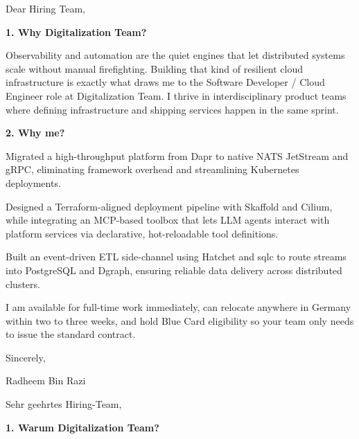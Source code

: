 \documentclass[11pt,a4paper]{coverletter}
\begin{document}

\opening{Dear Hiring Team,}

\vspace{8pt}\noindent\textbf{1. Why Digitalization Team?}\par\vspace{3pt}

Observability and automation are the quiet engines that let distributed systems scale without manual firefighting. Building that kind of resilient cloud infrastructure is exactly what draws me to the Software Developer / Cloud Engineer role at Digitalization Team. I thrive in interdisciplinary product teams where defining infrastructure and shipping services happen in the same sprint.

\vspace{8pt}\noindent\textbf{2. Why me?}\par\vspace{3pt}

\bullets

  \item Migrated a high-throughput platform from Dapr to native NATS JetStream and gRPC, eliminating framework overhead and streamlining Kubernetes deployments.

  \item Designed a Terraform-aligned deployment pipeline with Skaffold and Cilium, while integrating an MCP-based toolbox that lets LLM agents interact with platform services via declarative, hot-reloadable tool definitions.

  \item Built an event-driven ETL side-channel using Hatchet and sqlc to route streams into PostgreSQL and Dgraph, ensuring reliable data delivery across distributed clusters.

\bulletsend

I am available for full-time work immediately, can relocate anywhere in Germany within two to three weeks, and hold Blue Card eligibility so your team only needs to issue the standard contract.

\closing{Sincerely,}{Radheem Bin Razi}

\clearpage
{}


\opening{Sehr geehrtes Hiring-Team,}

\vspace{8pt}\noindent\textbf{1. Warum Digitalization Team?}\par\vspace{3pt}
\end{document}
